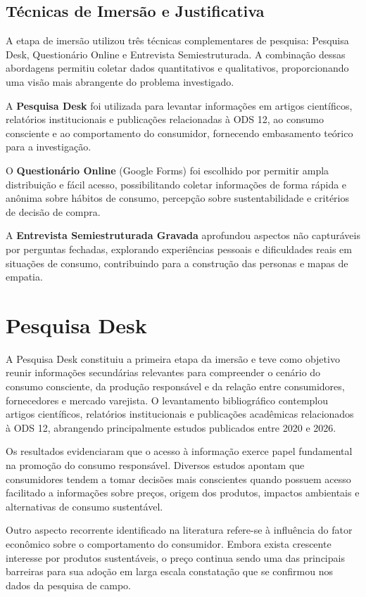 \documentclass[12pt, a4paper]{article}
\newcommand{\novaSecao}[1]{\clearpage\vspace*{2.2cm}\section{#1}}
\begin{document}
\subsection{Técnicas de Imersão e Justificativa}

A etapa de imersão utilizou três técnicas complementares de pesquisa: Pesquisa Desk, Questionário Online e Entrevista Semiestruturada. A combinação dessas abordagens permitiu coletar dados quantitativos e qualitativos, proporcionando uma visão mais abrangente do problema investigado.

A \textbf{Pesquisa Desk} foi utilizada para levantar informações em artigos científicos, relatórios institucionais e publicações relacionadas à ODS 12, ao consumo consciente e ao comportamento do consumidor, fornecendo embasamento teórico para a investigação.

O \textbf{Questionário Online} (Google Forms) foi escolhido por permitir ampla distribuição e fácil acesso, possibilitando coletar informações de forma rápida e anônima sobre hábitos de consumo, percepção sobre sustentabilidade e critérios de decisão de compra.

A \textbf{Entrevista Semiestruturada Gravada} aprofundou aspectos não capturáveis por perguntas fechadas, explorando experiências pessoais e dificuldades reais em situações de consumo, contribuindo para a construção das personas e mapas de empatia.

\novaSecao{Pesquisa Desk}

A Pesquisa Desk constituiu a primeira etapa da imersão e teve como objetivo reunir informações secundárias relevantes para compreender o cenário do consumo consciente, da produção responsável e da relação entre consumidores, fornecedores e mercado varejista. O levantamento bibliográfico contemplou artigos científicos, relatórios institucionais e publicações acadêmicas relacionados à ODS 12, abrangendo principalmente estudos publicados entre 2020 e 2026.

Os resultados evidenciaram que o acesso à informação exerce papel fundamental na promoção do consumo responsável. Diversos estudos apontam que consumidores tendem a tomar decisões mais conscientes quando possuem acesso facilitado a informações sobre preços, origem dos produtos, impactos ambientais e alternativas de consumo sustentável.

Outro aspecto recorrente identificado na literatura refere-se à influência do fator econômico sobre o comportamento do consumidor. Embora exista crescente interesse por produtos sustentáveis, o preço continua sendo uma das principais barreiras para sua adoção em larga escala \textemdash{} constatação que se confirmou nos dados da pesquisa de campo.
\end{document}
